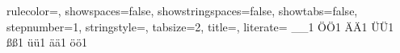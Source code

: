 {  rulecolor=\color{black},         																		%
  showspaces=false,                																		%
  showstringspaces=false,          																		%
  showtabs=false,                  																		%
  stepnumber=1,                    																		%
  stringstyle=\color{java_net_string},     																%
  tabsize=2,	                   																		%
  title=\lstname,                  		 																%
  literate=%
  {_}{{\_}}1
  {Ö}{{\"O}}1
  {Ä}{{\"A}}1
  {Ü}{{\"U}}1
  {ß}{{\ss}}1
  {ü}{{\"u}}1
  {ä}{{\"a}}1
  {ö}{{\"o}}1																							%
}


